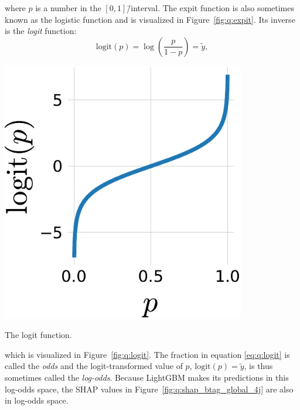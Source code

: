 \noindent where $p$ is a number in the $[0, 1]$\=/interval. The expit function is also sometimes known as the logistic function and is visualized in Figure~\ref{fig:q:expit}. Its inverse is the \emph{logit} function:
\begin{equation}
  \label{eq:q:logit}
  \mathrm{logit}(p) = \log \left( \frac{p}{1-p}  \right) = \tilde{y},
\end{equation}

 \begin{marginfigure}
  \centerfloat
  \includegraphics[width=0.8\textwidth]{figures/logit_expit/logit.pdf}
  \caption[The logit Function]
          {The logit function.} 
  \label{fig:q:logit}
\end{marginfigure}

 \noindent which is visualized in Figure~\ref{fig:q:logit}. The fraction in equation \eqref{eq:q:logit} is called the \emph{odds} and the logit-transformed value of $p$, $\mathrm{logit}(p)=\tilde{y}$, is thus sometimes called the \emph{log-odds}. Because LightGBM makes its predictions in this log-odds space, the SHAP values in Figure~\ref{fig:q:shap_btag_global_4j} are also in log-odds space. 

